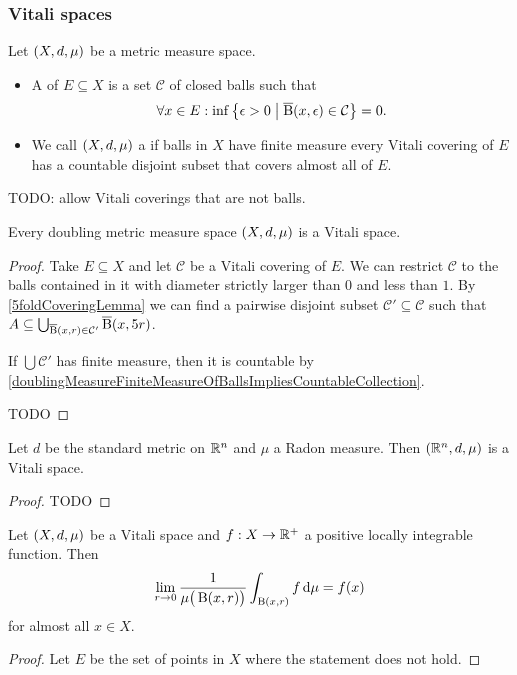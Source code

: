 \subsubsection{Vitali spaces}
\begin{definition}
Let $\sSet{X,d,\mu}$ be a metric measure space.
\begin{itemize}
\item A  of $E\subseteq X$ is a set $\mathcal{C}$ of closed balls such that 
\[ \forall x\in E: \inf \setbuilder{\epsilon > 0}{\cball(x,\epsilon) \in \mathcal{C}} = 0. \]
\item We call $\sSet{X,d,\mu}$ a  if balls in $X$ have finite measure every Vitali covering of $E$ has a countable disjoint subset that covers almost all of $E$.
\end{itemize}
\end{definition}
TODO: allow Vitali coverings that are not balls.

\begin{theorem}
Every doubling metric measure space $\sSet{X,d,\mu}$ is a Vitali space.
\end{theorem}
\begin{proof}
Take $E\subseteq X$ and let $\mathcal{C}$ be a Vitali covering of $E$. We can restrict $\mathcal{C}$ to the balls contained in it with diameter strictly larger than $0$ and less than $1$. By \ref{5foldCoveringLemma} we can find a pairwise disjoint subset $\mathcal{C}'\subseteq \mathcal{C}$ such that $A\subseteq \bigcup_{\operatorname{\overline{B}}(x,r)\in \mathcal{C}'}\operatorname{\overline{B}}(x,5r)$.

If $\bigcup \mathcal{C}'$ has finite measure, then it is countable by \ref{doublingMeasureFiniteMeasureOfBallsImpliesCountableCollection}.

TODO
\end{proof}

\begin{proposition}
Let $d$ be the standard metric on $\mathbb{R}^n$ and $\mu$ a Radon measure. Then $\sSet{\R^n, d,\mu}$ is a Vitali space.
\end{proposition}
\begin{proof}
TODO
\end{proof}

\begin{theorem}
Let $\sSet{X,d,\mu}$ be a Vitali space and $f: X\to \mathbb{R}^+$ a positive locally integrable function. Then
\[ \lim_{r\to 0} \frac{1}{\mu\big(\operatorname{B}(x, r)\big)}\int_{\operatorname{B}(x, r)}f\operatorname{d \!}{\mu} = f(x) \]
for almost all $x\in X$.
\end{theorem}
\begin{proof}
Let $E$ be the set of points in $X$ where the statement does not hold. 
\end{proof}

